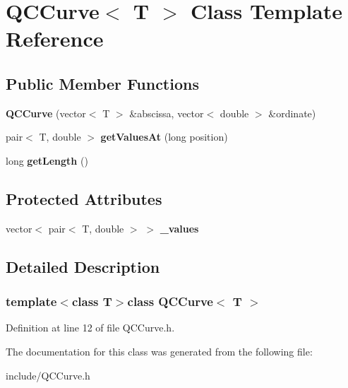 \hypertarget{class_q_c_curve}{\section{Q\+C\+Curve$<$ T $>$ Class Template Reference}
\label{class_q_c_curve}
}
\subsection*{Public Member Functions}
\begin{DoxyCompactItemize}
\item 
\hypertarget{class_q_c_curve_ae06036e13e430dd4151357bd649c9253}{{\bfseries Q\+C\+Curve} (vector$<$ T $>$ \&abscissa, vector$<$ double $>$ \&ordinate)}\label{class_q_c_curve_ae06036e13e430dd4151357bd649c9253}

\item 
\hypertarget{class_q_c_curve_a6ee52258c32718dc9c6c566286a35511}{pair$<$ T, double $>$ {\bfseries get\+Values\+At} (long position)}\label{class_q_c_curve_a6ee52258c32718dc9c6c566286a35511}

\item 
\hypertarget{class_q_c_curve_a196e3a697e436a9f2ce30ff228580899}{long {\bfseries get\+Length} ()}\label{class_q_c_curve_a196e3a697e436a9f2ce30ff228580899}

\end{DoxyCompactItemize}
\subsection*{Protected Attributes}
\begin{DoxyCompactItemize}
\item 
\hypertarget{class_q_c_curve_af2bb246f5a1afba933bbada9d3a3c742}{vector$<$ pair$<$ T, double $>$ $>$ {\bfseries \+\_\+values}}\label{class_q_c_curve_af2bb246f5a1afba933bbada9d3a3c742}

\end{DoxyCompactItemize}


\subsection{Detailed Description}
\subsubsection*{template$<$class T$>$class Q\+C\+Curve$<$ T $>$}



Definition at line 12 of file Q\+C\+Curve.\+h.



The documentation for this class was generated from the following file\+:\begin{DoxyCompactItemize}
\item 
include/Q\+C\+Curve.\+h\end{DoxyCompactItemize}
